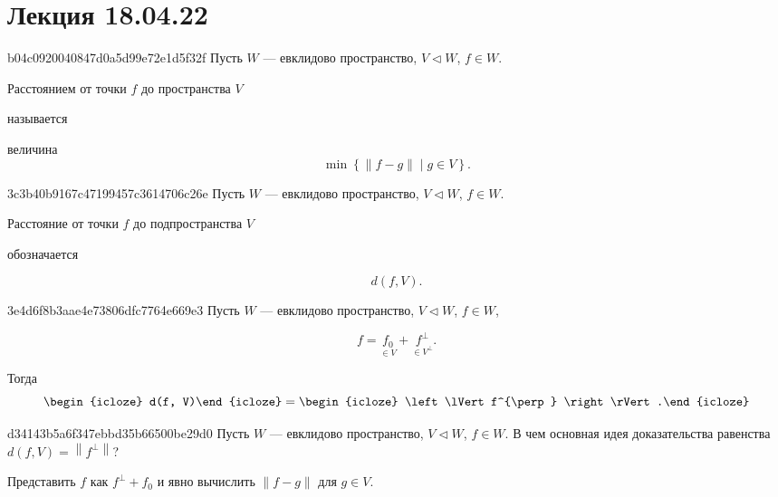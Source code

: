 \section{Лекция 18.04.22}
\begin{note}{b04c0920040847d0a5d99e72e1d5f32f}
    Пусть \({ W }\) --- евклидово пространство, \({ V \triangleleft W }\), \({ f \in W }\).
    \begin{icloze}{2}Расстоянием от точки \({ f }\) до пространства \({ V }\)\end{icloze} называется \begin{icloze}{1}величина
    \[
        \min \left\{ \left\lVert f - g \right\rVert \mid g \in V \right\}.
    \]\end{icloze}
\end{note}

\begin{note}{3c3b40b9167c47199457c3614706c26e}
    Пусть \({ W }\) --- евклидово пространство, \({ V \triangleleft W }\), \({ f \in W }\).
    \begin{icloze}{1}Расстояние от точки \({ f }\) до подпространства \({ V }\)\end{icloze} обозначается
    \begin{icloze}{2}
        \[
            d(f, V).
        \]
    \end{icloze}
\end{note}

\begin{note}{3e4d6f8b3aae4e73806dfc7764e669e3}
    Пусть \({ W }\) --- евклидово пространство, \({ V \triangleleft W }\), \({ f \in W }\),
    \begin{icloze}{3}
        \[
            f = \underset{\in V}{f_0} + \underset{\in V^{\perp}}{f^{\perp}}.
        \]
    \end{icloze}
    Тогда
    \[
        \begin{icloze}{2}d(f, V)\end{icloze} = \begin{icloze}{1}\left\lVert f^{\perp} \right\rVert.\end{icloze}
    \]
\end{note}

\begin{note}{d34143b5a6f347ebbd35b66500be29d0}
    Пусть \({ W }\) --- евклидово пространство, \({ V \triangleleft W }\), \({ f \in W }\).
    В чем  основная идея доказательства равенства \({ d(f, V) = \left\lVert f^{\perp} \right\rVert }\)?

    \begin{cloze}{1}
        Представить \({ f }\) как \({ f^{\perp} + f_0 }\) и явно вычислить \({ \left\lVert f - g \right\rVert }\) для \({ g \in V }\).
    \end{cloze}
\end{note}


